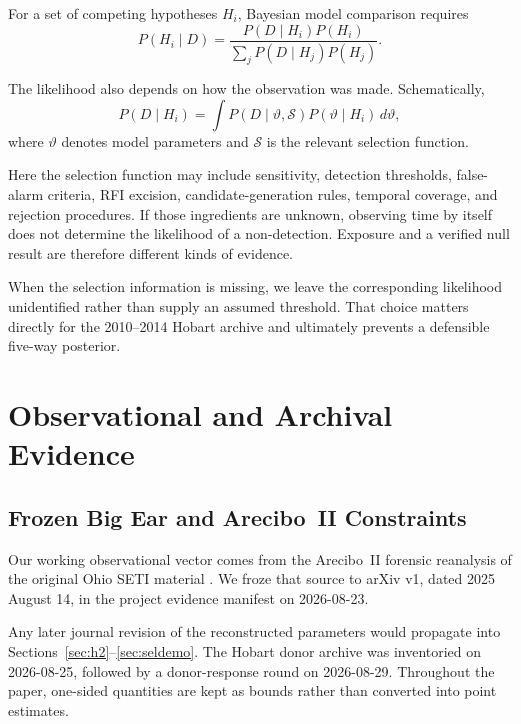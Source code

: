 \documentclass[crop]{CSL}
\begin{document}
For a set of competing hypotheses $H_i$, Bayesian model comparison requires
\begin{equation}
P(H_i\mid D)=
\frac{P(D\mid H_i)P(H_i)}
{\sum_j P(D\mid H_j)P(H_j)}.
\end{equation}

The likelihood also depends on how the observation was made. Schematically,
\begin{equation}
P(D\mid H_i)=
\int P(D\mid\vartheta,\mathcal{S})
P(\vartheta\mid H_i)\,d\vartheta,
\label{eq:general_likelihood}
\end{equation}
where $\vartheta$ denotes model parameters and $\mathcal{S}$ is the relevant selection function.

Here the selection function may include sensitivity, detection thresholds, false-alarm criteria, RFI excision, candidate-generation rules, temporal coverage, and rejection procedures. If those ingredients are unknown, observing time by itself does not determine the likelihood of a non-detection. Exposure and a verified null result are therefore different kinds of evidence.

When the selection information is missing, we leave the corresponding likelihood unidentified rather than supply an assumed threshold. That choice matters directly for the 2010--2014 Hobart archive and ultimately prevents a defensible five-way posterior.


\section{Observational and Archival Evidence}
\label{sec:observations}

\subsection{Frozen Big Ear and Arecibo~II Constraints}

Our working observational vector comes from the Arecibo~II forensic reanalysis of the original Ohio SETI material \citep{mendez2025}. We froze that source to arXiv v1, dated 2025 August 14, in the project evidence manifest on 2026-08-23.

Any later journal revision of the reconstructed parameters would propagate into Sections~\ref{sec:h2}--\ref{sec:seldemo}. The Hobart donor archive was inventoried on 2026-08-25, followed by a donor-response round on 2026-08-29. Throughout the paper, one-sided quantities are kept as bounds rather than converted into point estimates.
\end{document}
